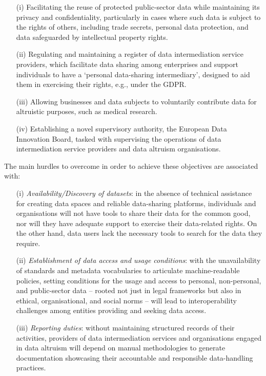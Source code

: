 \begin{enumerate}
    \item[(i)] Facilitating the reuse of protected public-sector data while maintaining its privacy and confidentiality, particularly in cases where such data is subject to the rights of others, including trade secrets, personal data protection, and data safeguarded by intellectual property rights.
    \item[(ii)] Regulating and maintaining a register of data intermediation service providers, which facilitate data sharing among enterprises and support individuals to have a `personal data-sharing intermediary', designed to aid them in exercising their rights, e.g., under the GDPR.
    \item[(iii)] Allowing businesses and data subjects to voluntarily contribute data for altruistic purposes, such as medical research.
    \item[(iv)] Establishing a novel supervisory authority, the European Data Innovation Board, tasked with supervising the operations of data intermediation service providers and data altruism organisations.
\end{enumerate}

The main hurdles to overcome in order to achieve these objectives are associated with:

\begin{enumerate}
    \item[(i)] \textit{Availability/Discovery of datasets}: in the absence of technical assistance for creating data spaces and reliable data-sharing platforms, individuals and organisations will not have tools to share their data for the common good, nor will they have adequate support to exercise their data-related rights. On the other hand, data users lack the necessary tools to search for the data they require.
    \item[(ii)] \textit{Establishment of data access and usage conditions}: with the unavailability of standards and metadata vocabularies to articulate machine-readable policies, setting conditions for the usage and access to personal, non-personal, and public-sector data -- rooted not just in legal frameworks but also in ethical, organisational, and social norms -- will lead to interoperability challenges among entities providing and seeking data access.
    \item[(iii)] \textit{Reporting duties}: without maintaining structured records of their activities, providers of data intermediation services and organisations engaged in data altruism will depend on manual methodologies to generate documentation showcasing their accountable and responsible data-handling practices.
\end{enumerate}

